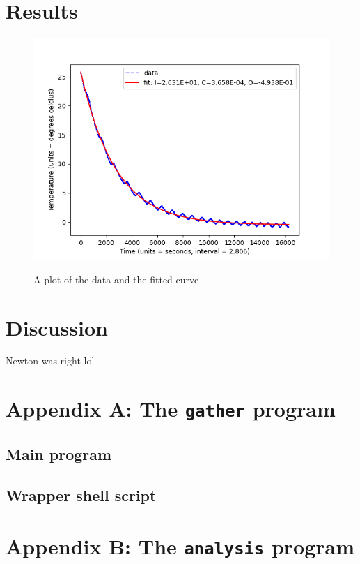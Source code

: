 \documentclass[12pt]{article}
\begin{document}
\section{Results}

\begin{figure}
	\includegraphics[scale=0.8]{Figure_1.png}
	\centering
	\label{fig1}
	\caption{A plot of the data and the fitted curve}
\end{figure}

\section{Discussion}

Newton was right lol

\section{Appendix A: The \texttt{gather} program} \label{apxA}

\subsection{Main program}



\subsection{Wrapper shell script}



\section{Appendix B: The \texttt{analysis} program} \label{apxB}





\end{document}
